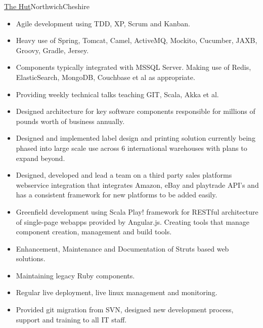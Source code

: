 \documentclass[a4paper,10pt]{moderncv}
\newcommand\weblink[2] {{\color{href} \href{#1}{#2}}}
\begin{document}
{\weblink{http://www.thehutgroup.com}{The Hut}}{Northwich}{Cheshire}{
\begin{itemize}
  \item Agile development using TDD, XP, Scrum and Kanban.
  \item Heavy use of Spring, Tomcat, Camel, ActiveMQ, Mockito, Cucumber, JAXB, Groovy, Gradle, Jersey.
  \item Components typically integrated with MSSQL Server. Making use of Redis, ElasticSearch, MongoDB, Couchbase et al as appropriate.
  \item Providing weekly technical talks teaching GIT, Scala, Akka et al.
  \item Designed architecture for key software components responsible for millions of pounds worth of business annually.
  \item Designed and implemented label design and printing solution currently being phased into large scale use across 6 international warehouses with plans to expand beyond.
  \item Designed, developed and lead a team on a third party sales platforms webservice integration that integrates Amazon, eBay and playtrade API's and has a consistent framework for new platforms to be added easily.
  \item Greenfield development using Scala Play! framework for RESTful architecture of single-page webapps provided by Angular.js. Creating tools that manage component creation, management and build tools.
  \item Enhancement, Maintenance and Documentation of Struts based web solutions.
  \item Maintaining legacy Ruby components.
  \item Regular live deployment, live linux management and monitoring.
  \item Provided git migration from SVN, designed new development process, support and training to all IT staff.
\end{itemize}
}
\end{document}
